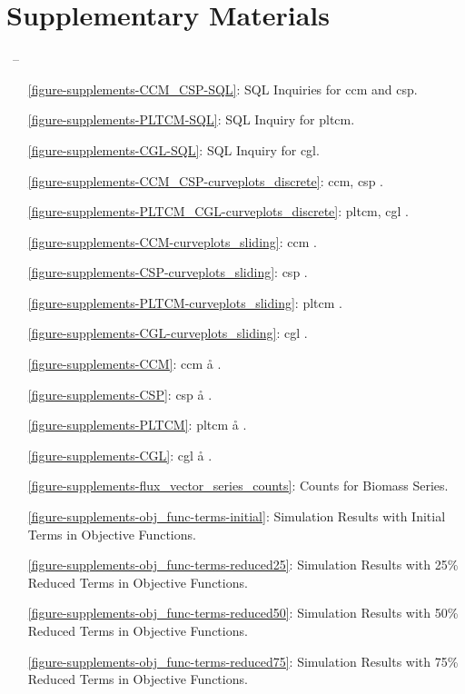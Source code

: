 \chapter*{Supplementary Materials}\label{Supp_first}
%
{\thepage\ -- \pageref{LastPage}}
\captionsetup{list=no}
\thispagestyle{plain}
\vspace*{-0.75cm}
\begin{itemize}
	\item[\ref{figure-supplements-CCM_CSP-SQL}:] SQL Inquiries for \acs{ccm} and \acs{csp}.
	\item[\ref{figure-supplements-PLTCM-SQL}:] SQL Inquiry for \acs{pltcm}.
	\item[\ref{figure-supplements-CGL-SQL}:] SQL Inquiry for \acs{cgl}.
	\item[\ref{figure-supplements-CCM_CSP-curveplots_discrete}:] \acs{ccm}, \acs{csp} \cc{} \ee{}.
	\item[\ref{figure-supplements-PLTCM_CGL-curveplots_discrete}:] \acs{pltcm}, \acs{cgl} \cc{} \ee{}.
	\item[\ref{figure-supplements-CCM-curveplots_sliding}:] \acs{ccm} \cc{} \dd{}.
	\item[\ref{figure-supplements-CSP-curveplots_sliding}:] \acs{csp} \cc{} \dd{}.
	\item[\ref{figure-supplements-PLTCM-curveplots_sliding}:] \acs{pltcm} \cc{} \dd{}.
	\item[\ref{figure-supplements-CGL-curveplots_sliding}:] \acs{cgl} \cc{} \dd{}.
	\item[\ref{figure-supplements-CCM}:] \acs{ccm} \aa{} \bb{}.
	\item[\ref{figure-supplements-CSP}:] \acs{csp} \aa{} \bb{}.
	\item[\ref{figure-supplements-PLTCM}:] \acs{pltcm} \aa{} \bb{}.
	\item[\ref{figure-supplements-CGL}:] \acs{cgl} \aa{} \bb{}.
	\item[\ref{figure-supplements-flux_vector_series_counts}:] Counts for Biomass Series.
	\item[\ref{figure-supplements-obj_func-terms-initial}:] Simulation Results with Initial Terms in Objective Functions.
	\item[\ref{figure-supplements-obj_func-terms-reduced25}:] Simulation Results with 25\% Reduced Terms in Objective Functions.
	\item[\ref{figure-supplements-obj_func-terms-reduced50}:] Simulation Results with 50\% Reduced Terms in Objective Functions.
	\item[\ref{figure-supplements-obj_func-terms-reduced75}:] Simulation Results with 75\% Reduced Terms in Objective Functions.
\end{itemize}
\clearpage

